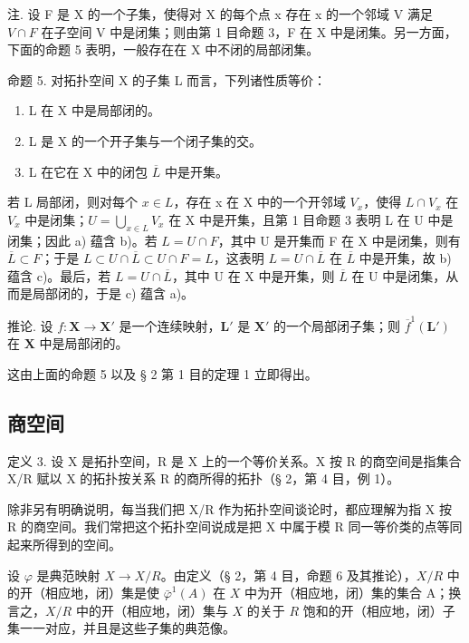 注. 设 F 是 X 的一个子集，使得对 X 的每个点 x 存在 x 的一个邻域 V 满足 \(V \cap F\) 在子空间 V 中是闭集；则由第 1 目命题 3，F 在 X 中是闭集。另一方面，下面的命题 5 表明，一般存在在 X 中不闭的局部闭集。

命题 5. 对拓扑空间 X 的子集 L 而言，下列诸性质等价：

\begin{enumerate}
\def\labelenumi{\alph{enumi})}
\item
  L 在 X 中是局部闭的。
\item
  L 是 X 的一个开子集与一个闭子集的交。
\item
  L 在它在 X 中的闭包 \(\overline{L}\) 中是开集。
\end{enumerate}

若 L 局部闭，则对每个 \(x \in L\)，存在 x 在 X 中的一个开邻域 \(V_{x}\)，使得 \(L \cap V_{x}\) 在 \(V_{x}\) 中是闭集；\(U = \bigcup_{x \in L} V_{x}\) 在 X 中是开集，且第 1 目命题 3 表明 L 在 U 中是闭集；因此 a) 蕴含 b)。若 \(L = U \cap F\)，其中 U 是开集而 F 在 X 中是闭集，则有 \(\overline{L} \subset F\)；于是 \(L \subset U \cap \overline{L} \subset U \cap F = L\)，这表明 \(L = U \cap \overline{L}\) 在 \(\overline{L}\) 中是开集，故 b) 蕴含 c)。最后，若 \(L = U \cap \overline{L}\)，其中 U 在 X 中是开集，则 \(\overline{L}\) 在 U 中是闭集，从而是局部闭的，于是 c) 蕴含 a)。

推论. 设 \(f: \mathbf{X} \to \mathbf{X}'\) 是一个连续映射，\(\mathbf{L}'\) 是 \(\mathbf{X}'\) 的一个局部闭子集；则 \(\overline{f}^{1}(\mathbf{L}')\) 在 \(\mathbf{X}\) 中是局部闭的。

这由上面的命题 5 以及 § 2 第 1 目的定理 1 立即得出。

\subsection{商空间}

定义 3. 设 X 是拓扑空间，R 是 X 上的一个等价关系。X 按 R 的商空间是指集合 X/R 赋以 X 的拓扑按关系 R 的商所得的拓扑（§ 2，第 4 目，例 1）。

除非另有明确说明，每当我们把 X/R 作为拓扑空间谈论时，都应理解为指 X 按 R 的商空间。我们常把这个拓扑空间说成是把 X 中属于模 R 同一等价类的点等同起来所得到的空间。

设 \(\varphi\) 是典范映射 \(X \to X/R\)。由定义（§ 2，第 4 目，命题 6 及其推论），\(X/R\) 中的开（相应地，闭）集是使 \(\bar{\varphi}^{1}(A)\) 在 \(X\) 中为开（相应地，闭）集的集合 A；换言之，\(X/R\) 中的开（相应地，闭）集与 \(X\) 的关于 \(R\) 饱和的开（相应地，闭）子集一一对应，并且是这些子集的典范像。

